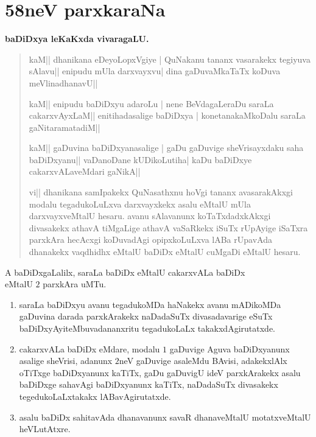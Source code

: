 \chapter{58neV parxkaraNa}

\begin{center}
{\bf baDiDxya leKaKxda vivaragaLU.}
\end{center}


\begin{verse}
kaM|| dhanikana eDeyoLopxVgiye | QuNakanu tananx vasarakekx tegiyuva sAlavu||
enipudu mUla darxvayxvu| dina gaDuvaMkaTaTx koDuva meVlinadhanavU||

kaM|| enipudu baDiDxyu adaroLu | nene BeVdagaLeraDu saraLa cakarxvAyxLaM||
enitihadasalige baDiDxya | konetanakaMkoDalu saraLa gaNitaramatadiM||

kaM|| gaDuvina baDiDxyanasalige | gaDu gaDuvige sheVrisayxdaku saha baDiDxyanu||
vaDanoDane kUDikoLutiha| kaDu baDiDxye cakarxvALaveMdari gaNikA||

vi|| dhanikana samIpakekx QuNasathxnu hoVgi tananx avasarakAkxgi modalu tegadukoLuLxva darxvayxkekx asalu eMtalU mUla darxvayxveMtalU hesaru. avanu sAlavanunx koTaTxdadxkAkxgi divasakekx athavA tiMgaLige athavA vaSaRkekx iSuTx rUpAyige iSaTxra parxkAra hecAcxgi koDuvadAgi opipxkoLuLxva lABa rUpavAda dhanakekx vaqdhidhx eMtalU baDiDx eMtalU cuMgaDi eMtalU hesaru.
\end{verse}

\begin{center}
A baDiDxgaLalilx, saraLa baDiDx eMtalU cakarxvALa baDiDx\\
eMtalU $2$ parxkAra uMTu.
\end{center}

\begin{enumerate}[\rm(1)]
\item saraLa baDiDxyu avanu tegadukoMDa haNakekx avanu mADikoMDa gaDuvina darada parxkArakekx naDadaSuTx divasadavarige eSuTx baDiDxyAyiteMbuvadananxritu tegadukoLaLx takakxdAgirutatxde.

\item cakarxvALa baDiDx eMdare, modalu $1$ gaDuvige Aguva baDiDxyanunx asalige sheVrisi, adanunx $2$neV gaDuvige asaleMdu BAvisi, adakekxlAlx oTiTxge baDiDxyanunx kaTiTx, gaDu gaDuvigU ideV parxkArakekx asalu baDiDxge sahavAgi baDiDxyanunx kaTiTx, naDadaSuTx divasakekx tegedukoLaLxtakakx lABavAgirutatxde.

\item asalu baDiDx sahitavAda dhanavanunx savaR dhanaveMtalU motatxveMtalU heVLutAtxre.
\end{enumerate}

